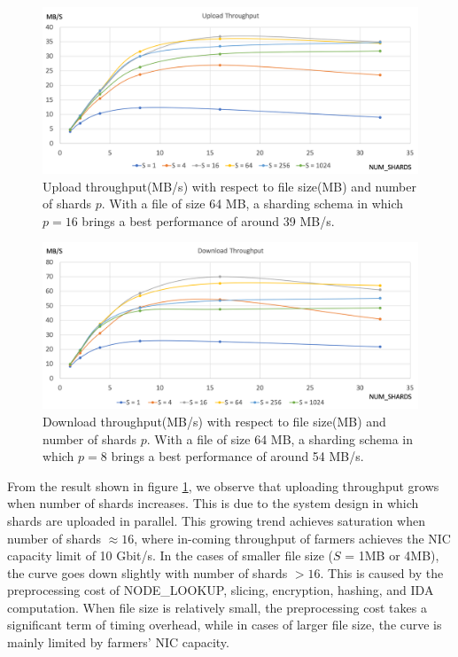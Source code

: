 \begin{figure}[hbt]
\centering
  \includegraphics[width=14cm]{charts/chart_upload_throughput.png}
  \caption[Upload throughput with respect to file size and number of shards]{Upload throughput(MB/s) with respect to file size(MB) and number of shards $p$. With a file of size 64 MB, a sharding schema in which $p=16$ brings a best performance of around 39 MB/s.}
  \label{fig:uploadthroughput}
\end{figure}

\begin{figure}[hbt]
\centering
  \includegraphics[width=14cm]{charts/chart_download_throughput.png}
  \caption[Download throughput with respect to file size and number of shards]{Download throughput(MB/s) with respect to file size(MB) and number of shards $p$. With a file of size 64 MB, a sharding schema in which $p=8$ brings a best performance of around 54 MB/s.}
  \label{fig:downloadthroughput}
\end{figure}

From the result shown in figure \ref{fig:uploadthroughput}, we observe that uploading throughput grows when number of shards increases. This is due to the system design in which shards are uploaded in parallel. This growing trend achieves saturation when number of shards $\approx 16$, where in-coming throughput of farmers achieves the NIC capacity limit of 10 Gbit/s. In the cases of smaller file size ($S$ = 1MB or 4MB), the curve goes down slightly with number of shards $> 16$. This is caused by the preprocessing cost of NODE\_LOOKUP, slicing, encryption, hashing, and IDA computation. When file size is relatively small, the preprocessing cost takes a significant term of timing overhead, while in cases of larger file size, the curve is mainly limited by farmers' NIC capacity.

